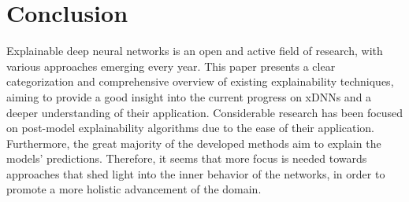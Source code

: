 \documentclass[journal]{IEEEtran}
\begin{document}
\section{Conclusion}
Explainable deep neural networks is an open and active field of research, with various approaches emerging every year. This paper presents a clear categorization and comprehensive overview of existing explainability techniques, aiming to provide a good insight into the current progress on xDNNs and a deeper understanding of their application. Considerable research has been focused on post-model explainability algorithms due to the ease of their application. Furthermore, the great majority of the developed methods aim to explain the models’ predictions. Therefore, it seems that more focus is needed towards approaches that shed light into the inner behavior of the networks, in order to promote a more holistic advancement of the domain. 


\ifCLASSOPTIONcaptionsoff
  \newpage
\fi


\printbibliography


\vfill
\end{document}
